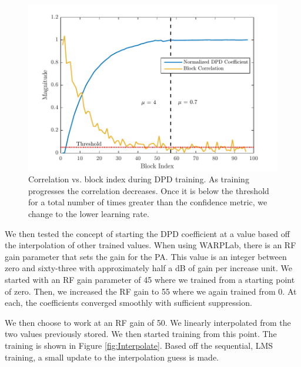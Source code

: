 \begin{figure}[t!] 
\centering
\includegraphics[width=0.9\columnwidth]{Figures/Convergence_Mu}
\caption{Correlation vs. block index during DPD training. 
	As training progresses the correlation decreases. 
	Once it is below the threshold for a total number of times greater than the confidence metric, we change to the lower learning rate.}
\label{fig:Convergence_Mu}
\end{figure}

We then tested the concept of starting the DPD coefficient at a value based off the interpolation of other trained values. 
When using WARPLab, there is an RF gain parameter that sets the gain for the PA. This value is an integer between zero and sixty-three with approximately half a dB of gain per increase unit. We started with an RF gain parameter of 45 where we trained from a starting point of zero. Then, we increased the RF gain to 55 where we again trained from 0. At each, the coefficients converged smoothly with sufficient suppression. 

We then choose to work at an RF gain of 50. We linearly interpolated from the two values previously stored. We then started training from this point. The training is shown in Figure \ref{fig:Interpolate}. Based off the sequential, LMS training, a small update to the interpolation guess is made. 

